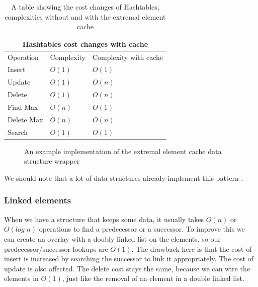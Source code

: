 \documentclass[a4paper,11pt]{article}
\begin{document}
				\begin{table}[h!]
				\centering
				\begin{tabular}{|l|l|l|}
					\hline
					\multicolumn{3}{|c|}{Hashtables cost changes with cache} \\
					\hline
					Operation & Complexity & Complexity with cache \\
					\hline
					Insert 	        & $O(1)$ & $O(1)$ \\
					Update          & $O(1)$ & {\color{red}$O(n)$} \\
					Delete	        & $O(1)$ & {\color{red}$O(n)$} \\
					Find Max 	& $O(n)$ & {\color{darkgreen}$O(1)$}\\
					Delete Max	& $O(n)$ & $O(n)$ \\
					Search 		& $O(1)$ & $O(1)$ \\
					\hline
				\end{tabular}
				\caption{A table showing the cost changes of Hashtables; complexities without and with the
				extremal element cache}
				\label{tab:rbt-cost-change}
			\end{table}

			\begin{figure}
				

				\caption{An example implementation of the extremal element cache data structure wrapper}

				\label{fig:elem-cache}
			\end{figure}

			We should note that a lot of data structures already implement this pattern \cite{Wiveb}.

        \subsubsection{Linked elements}\label{sec:gdsm:le}

			When we have a structure that keeps some data, it usually takes $O(n)$ or $O(log \; n)$ operations
			to find a predecessor or a successor. To improve this we can create an overlay with a doubly
			linked list on the elements, so our predecessor/successor lookups are $O(1)$. The drawback here is
			that the cost of insert is increased by searching the successor to link it appropriately. The cost of
			update is also affected. The delete cost stays the same, because we can wire the elements in $O(1)$, 
			just like the removal of an element in a double linked list.
\end{document}
